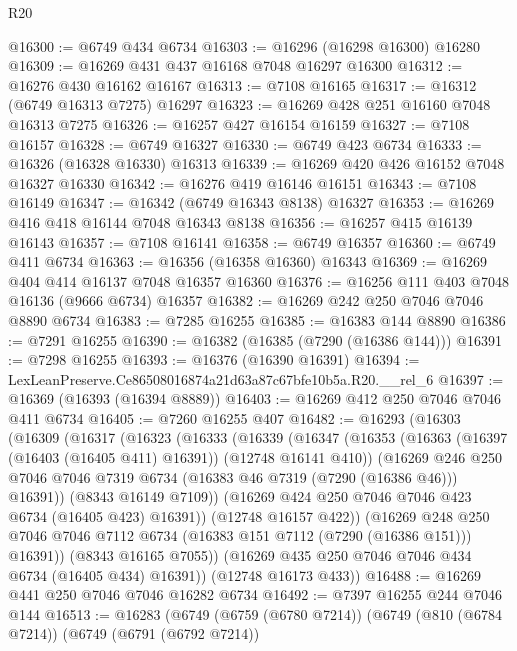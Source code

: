 \begin{lexlean}{R20}
\begin{coremodule}
{@16300 := @6749 @434 @6734
@16303 := @16296 (@16298 @16300) @16280
@16309 := @16269 @431 @437 @16168 @7048 @16297 @16300
@16312 := @16276 @430 @16162 @16167
@16313 := @7108 @16165
@16317 := @16312 (@6749 @16313 @7275) @16297
@16323 := @16269 @428 @251 @16160 @7048 @16313 @7275
@16326 := @16257 @427 @16154 @16159
@16327 := @7108 @16157
@16328 := @6749 @16327
@16330 := @6749 @423 @6734
@16333 := @16326 (@16328 @16330) @16313
@16339 := @16269 @420 @426 @16152 @7048 @16327 @16330
@16342 := @16276 @419 @16146 @16151
@16343 := @7108 @16149
@16347 := @16342 (@6749 @16343 @8138) @16327
@16353 := @16269 @416 @418 @16144 @7048 @16343 @8138
@16356 := @16257 @415 @16139 @16143
@16357 := @7108 @16141
@16358 := @6749 @16357
@16360 := @6749 @411 @6734
@16363 := @16356 (@16358 @16360) @16343
@16369 := @16269 @404 @414 @16137 @7048 @16357 @16360
@16376 := @16256 @111 @403 @7048 @16136 (@9666 @6734) @16357
@16382 := @16269 @242 @250 @7046 @7046 @8890 @6734
@16383 := @7285 @16255
@16385 := @16383 @144 @8890
@16386 := @7291 @16255
@16390 := @16382 (@16385 (@7290 (@16386 @144)))
@16391 := @7298 @16255
@16393 := @16376 (@16390 @16391)
@16394 := LexLeanPreserve.Ce86508016874a21d63a87c67bfe10b5a.R20.__rel_6
@16397 := @16369 (@16393 (@16394 @8889))
@16403 := @16269 @412 @250 @7046 @7046 @411 @6734
@16405 := @7260 @16255 @407
@16482 := @16293
    (@16303
      (@16309
        (@16317
          (@16323
            (@16333
              (@16339
                (@16347
                  (@16353
                    (@16363 (@16397 (@16403 (@16405 @411) @16391)) (@12748 @16141 @410))
                    (@16269
                      @246
                      @250
                      @7046
                      @7046
                      @7319
                      @6734
                      (@16383 @46 @7319 (@7290 (@16386 @46)))
                      @16391))
                  (@8343 @16149 @7109))
                (@16269 @424 @250 @7046 @7046 @423 @6734 (@16405 @423) @16391))
              (@12748 @16157 @422))
            (@16269
              @248
              @250
              @7046
              @7046
              @7112
              @6734
              (@16383 @151 @7112 (@7290 (@16386 @151)))
              @16391))
          (@8343 @16165 @7055))
        (@16269 @435 @250 @7046 @7046 @434 @6734 (@16405 @434) @16391))
      (@12748 @16173 @433))
@16488 := @16269 @441 @250 @7046 @7046 @16282 @6734
@16492 := @7397 @16255 @244 @7046 @144
@16513 := @16283
    (@6749
      (@6759 (@6780 @7214))
      (@6749
        (@810 (@6784 @7214))
        (@6749
          (@6791 (@6792 @7214))
}
\end{coremodule}
\end{lexlean}
